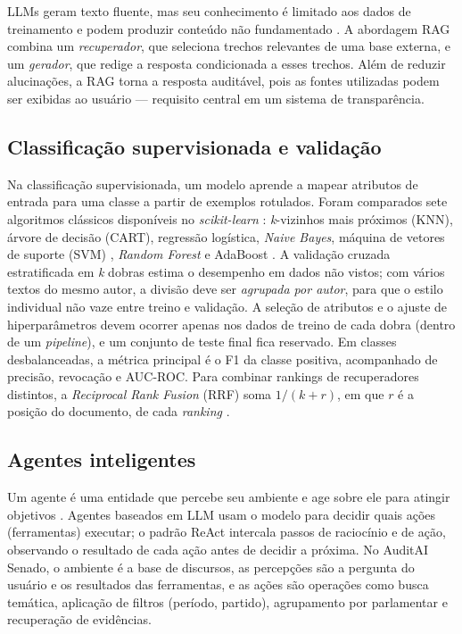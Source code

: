 \documentclass[12pt]{article}
\begin{document}
LLMs geram texto fluente, mas seu conhecimento é limitado aos dados de treinamento e podem
produzir conteúdo não fundamentado \cite{ji2023}. A abordagem RAG \cite{lewis2020} combina um
\emph{recuperador}, que seleciona trechos relevantes de uma base externa, e um \emph{gerador}, que
redige a resposta condicionada a esses trechos. Além de reduzir alucinações, a RAG torna a
resposta auditável, pois as fontes utilizadas podem ser exibidas ao usuário --- requisito central
em um sistema de transparência.

\subsection{Classificação supervisionada e validação}

Na classificação supervisionada, um modelo aprende a mapear atributos de entrada para uma classe
a partir de exemplos rotulados. Foram comparados sete algoritmos clássicos disponíveis no
\textit{scikit-learn} \cite{pedregosa2011}: \emph{k}-vizinhos mais próximos (KNN), árvore de
decisão (CART), regressão logística, \textit{Naive Bayes}, máquina de vetores de suporte (SVM)
\cite{cortes1995}, \textit{Random Forest} \cite{breiman2001} e AdaBoost \cite{freund1997}. A
validação cruzada estratificada em \emph{k} dobras estima o desempenho em dados não vistos; com
vários textos do mesmo autor, a divisão deve ser \emph{agrupada por autor}, para que o estilo
individual não vaze entre treino e validação. A seleção de atributos e o ajuste de hiperparâmetros
devem ocorrer apenas nos dados de treino de cada dobra (dentro de um \textit{pipeline}), e um
conjunto de teste final fica reservado. Em classes desbalanceadas, a métrica principal é o F1 da
classe positiva, acompanhado de precisão, revocação e AUC-ROC. Para combinar rankings de
recuperadores distintos, a \textit{Reciprocal Rank Fusion} (RRF) soma $1/(k+r)$, em que $r$ é a posição do documento, de
cada \textit{ranking} \cite{cormack2009}.

\subsection{Agentes inteligentes}

Um agente é uma entidade que percebe seu ambiente e age sobre ele para atingir objetivos
\cite{russell2022}. Agentes baseados em LLM usam o modelo para decidir quais ações (ferramentas)
executar; o padrão ReAct \cite{yao2023} intercala passos de raciocínio e de ação, observando o
resultado de cada ação antes de decidir a próxima. No AuditAI Senado, o ambiente é a base de
discursos, as percepções são a pergunta do usuário e os resultados das ferramentas, e as ações
são operações como busca temática, aplicação de filtros (período, partido), agrupamento por
parlamentar e recuperação de evidências.
\end{document}
